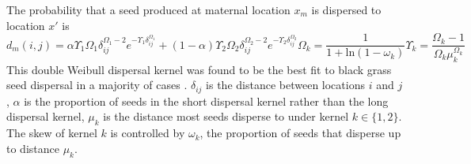\documentclass[10pt,letterpaper]{article}
\begin{document}
The probability that a seed produced at maternal location $x_m$ is dispersed to location $x'$ is 
\begin{subequations}\label{eq:seed_disp}
\begin{equation}\label{eq:seed_kern}
	d_m(i, j) = \alpha \Upsilon_1 \Omega_1 \delta_{ij}^{\Omega_1 - 2} e^{-\Upsilon_1 \delta_{ij}^{\Omega_1}} + (1 - \alpha) \Upsilon_2 \Omega_2 \delta_{ij}^{\Omega_2 - 2} e^{-\Upsilon_2 \delta_{ij}^{\Omega_2}}  
\end{equation}
\begin{equation}\label{eq:shape}
	\Omega_k = \frac{1}{1 + \text{ln}(1 - \omega_k)}
\end{equation}
\begin{equation}\label{eq:scale}
	\Upsilon_k = \frac{\Omega_k - 1}{\Omega_k \mu_k^{\Omega_k}}
\end{equation}
\end{subequations} 
This double Weibull dispersal kernel was found to be the best fit to black grass seed dispersal in a majority of cases \cite{Colb2001}. $\delta_{ij}$ is the distance between locations $i$ and $j$, $\alpha$ is the proportion of seeds in the short dispersal kernel rather than the long dispersal kernel, $\mu_k$ is the distance most seeds disperse to under kernel $k \in \{1, 2\}$. The skew of kernel $k$ is controlled by $\omega_k$, the proportion of seeds that disperse up to distance $\mu_k$. 
\end{document}
